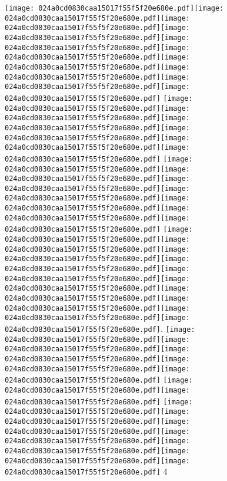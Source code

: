 \documentclass{article}
\newcommand{\origpg}[2]{\texttt{[image: 024a0cd0830caa15017f55f5f20e680e.pdf]}}
\begin{document}
{\vspace{0.385pt}\origpg9{85.303pt 418.08pt 93.938pt 434.22pt}\origpg9{93.938pt 418.08pt 101.1pt 434.22pt}\origpg9{101.18pt 418.08pt 109.82pt 434.22pt}\origpg9{109.82pt 418.08pt 120.67pt 434.22pt}\origpg9{120.67pt 418.08pt 127.72pt 434.22pt}\origpg9{127.72pt 418.08pt 138.57pt 434.22pt}\hspace{-0.274pt}\origpg9{138.29pt 418.08pt 145.91pt 434.22pt}\hspace{-0.387pt}\origpg9{145.52pt 418.08pt 152.69pt 434.22pt}\hspace{0.291pt}\origpg9{152.98pt 418.08pt 161.03pt 434.22pt}\origpg9{160.94pt 418.08pt 169.57pt 434.22pt} \origpg9{181.4pt 418.08pt 190.04pt 434.22pt}\origpg9{190.04pt 418.08pt 198.11pt 434.22pt}\hspace{-0.323pt}\origpg9{197.78pt 418.08pt 205.84pt 434.22pt}\origpg9{205.74pt 418.08pt 214.38pt 434.22pt}\origpg9{214.38pt 418.08pt 222.45pt 434.22pt}\hspace{0.145pt}\origpg9{222.59pt 418.08pt 229.76pt 434.22pt} \origpg9{241.36pt 418.08pt 249.42pt 434.22pt}\origpg9{249.32pt 418.08pt 257.39pt 434.22pt}\hspace{-0.113pt}\origpg9{257.28pt 418.08pt 265.49pt 434.22pt}\origpg9{265.49pt 418.08pt 273.56pt 434.22pt}\hspace{-0.145pt}\origpg9{273.42pt 418.08pt 281.04pt 434.22pt}\origpg9{281.12pt 418.08pt 289.19pt 434.22pt}\origpg9{289.28pt 418.08pt 296.45pt 434.22pt} \origpg9{308.05pt 418.08pt 315.22pt 434.22pt}\origpg9{315.27pt 418.08pt 323.34pt 434.22pt}\hspace{-0.597pt}\origpg9{322.74pt 418.08pt 330.81pt 434.22pt}\hspace{-1.082pt}\origpg9{329.73pt 418.08pt 337.95pt 434.22pt}\origpg9{337.95pt 418.08pt 345.11pt 434.22pt}\origpg9{345.11pt 418.08pt 353.18pt 434.22pt}\hspace{0.145pt}\origpg9{353.33pt 418.08pt 360.49pt 434.22pt}\hspace{-0.178pt}\origpg9{360.32pt 418.08pt 368.95pt 434.22pt}\origpg9{368.95pt 418.08pt 377.59pt 434.22pt}\origpg9{377.65pt 418.08pt 384.82pt 434.22pt}. \origpg9{400.52pt 418.08pt 411.52pt 434.22pt}\origpg9{411.59pt 418.08pt 418.75pt 434.22pt}\hspace{0.291pt}\origpg9{419.05pt 418.08pt 427.1pt 434.22pt}\origpg9{427pt 418.08pt 434.17pt 434.22pt}\hspace{-0.178pt}\origpg9{433.99pt 418.08pt 441.16pt 434.22pt} \origpg9{452.76pt 418.08pt 461.4pt 434.22pt}\origpg9{461.4pt 418.08pt 468.56pt 434.22pt} \origpg9{480.43pt 418.08pt 488.5pt 434.22pt}\hspace{-0.113pt}\origpg9{488.38pt 418.08pt 497.02pt 434.22pt}\origpg9{497.02pt 418.08pt 504.19pt 434.22pt}\hspace{-0.145pt}\origpg9{504.04pt 418.08pt 512.11pt 434.22pt}\hspace{-0.355pt}\origpg9{511.76pt 418.08pt 520.39pt 434.22pt}\origpg9{520.39pt 418.08pt 528.23pt 434.22pt}\hspace{-0.339pt}\origpg9{527.9pt 418.08pt 535.06pt 434.22pt} 4 

}
\end{document}
